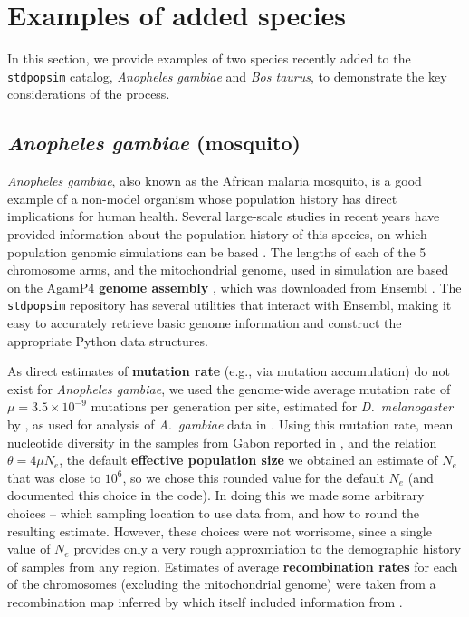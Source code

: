 \documentclass[hidelinks]{article}
\makeatletter
\newcommand{\stdpopsim}{\texttt{stdpopsim}\xspace}
\newcommand{\labelname}[1]{\def\@currentlabelname{#1}}
\makeatother
\begin{document}
\section*{Examples of added species}
    \labelname{Examples}
    \label{sec:examples}

In this section, we provide examples of two species recently added to the \stdpopsim catalog,
\textit{Anopheles gambiae} and \textit{Bos taurus},
to demonstrate the key considerations of the process.

\subsection*{\texorpdfstring{\emph{Anopheles gambiae} (mosquito)}{Anopheles gambiae (mosquito)}}
    \label{AnoGam}

\emph{Anopheles gambiae}, also known as the African malaria mosquito, is a good example
of a non-model organism whose population history has direct implications for human health.
Several large-scale studies in recent years have provided information about the
population history of this species, on which population genomic simulations can be based \citep[e.g.,][]{Miles2017, clarkson2020genome}.
The lengths of each of the 5 chromosome arms, and the mitochondrial genome,
used in simulation are based on the AgamP4 \textbf{genome assembly} \citep{Sharakhova2007}, which 
was downloaded from Ensembl \citep{ensembl2021}.
The \stdpopsim repository has several utilities that interact with Ensembl,
making it easy to accurately retrieve basic genome information and construct the appropriate Python data structures.

As direct estimates of \textbf{mutation rate} (e.g., via mutation accumulation) do not exist for \emph{Anopheles gambiae},
we used the genome-wide average mutation rate of $\mu=3.5 \times 10^{-9}$ mutations per generation per site,
estimated for \textit{D.~melanogaster} by \cite{Keightley2009},
as used for analysis of \textit{A.~gambiae} data in \citet{Miles2017}.
Using this mutation rate, mean nucleotide diversity in the samples from Gabon reported in \citet{Miles2017},
and the relation $\theta=4\mu N_e$, the default \textbf{effective population size}
we obtained an estimate of $N_e$ that was close to $10^6$,
so we chose this rounded value for the default $N_e$ (and documented this choice in the code).
In doing this we made some arbitrary choices
-- which sampling location to use data from, and how to round the resulting estimate.
However, these choices were not worrisome,
since a single value of $N_e$ provides only a very rough approxmiation to the demographic history
of samples from any region.
Estimates of average \textbf{recombination rates} for each of the chromosomes (excluding the mitochondrial genome)
were taken from a recombination map inferred by \citet{Pombi2006} which itself included information from
\citet{zheng1996integrated}.
\end{document}
